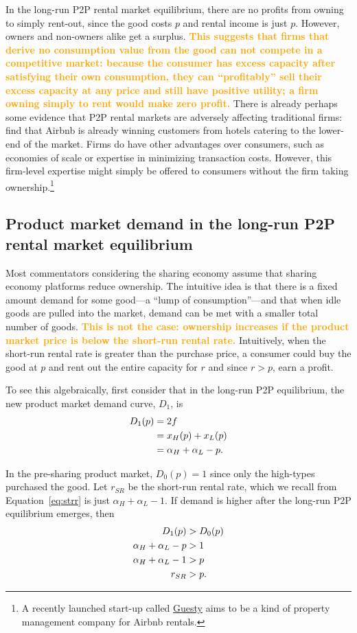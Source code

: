 \documentclass[11pt]{article}
\newcommand{\important}[1]{\textcolor{orange}{\textbf{#1}}}
\newcommand{\important}[1]{#1}
\begin{document}
In the long-run P2P rental market equilibrium, there are no profits from owning to simply rent-out, since the good costs $p$ and rental income is just $p$.  
However, owners and non-owners alike get a surplus. 
\important{This suggests that firms that derive no consumption value from the good can not compete in a competitive market: 
because the consumer has excess capacity after satisfying their own consumption, they can ``profitably'' sell their excess capacity at any price and still have positive utility; a firm owning simply to rent would make zero profit.} 
There is already perhaps some evidence that P2P rental markets are adversely affecting traditional firms: 
\cite{byers2013rise} find that Airbnb is already winning customers from hotels catering to the lower-end of the market. 
Firms do have other advantages over consumers, such as economies of scale or expertise in minimizing transaction costs. 
However, this firm-level expertise might simply be offered to consumers without the firm taking ownership.\footnote{A recently launched start-up called \href{https://www.guesty.com/}{Guesty} aims to be a kind of property management company for Airbnb rentals.} 

\subsection{Product market demand in the long-run P2P rental market equilibrium} 
Most commentators considering the sharing economy assume that sharing economy platforms reduce ownership. 
The intuitive idea is that there is a fixed amount demand for some good---a ``lump of consumption''---and that when idle goods are pulled into the market, demand can be met with a smaller total number of goods.
\important{This is not the case:  
ownership increases if the product market price is below the short-run rental rate.} 
Intuitively, when the short-run rental rate is greater than the purchase price, a consumer could buy the good at $p$ and rent out the entire capacity for $r$ and since $r > p$, earn a profit. 

To see this algebraically, first consider that in the long-run P2P equilibrium, the new product market demand curve, $D_1$, is
\begin{align}
D_1(p) &= 2f \notag \\  
     &= x_H(p) + x_L(p) \notag \\ 
     &= \alpha_H + \alpha_L - p.  
\end{align} 

In the pre-sharing product market, $D_0(p) = 1$ since only the high-types purchased the good. 
Let $r_{SR}$ be the short-run rental rate, which we recall from Equation~\ref{eq:strr} is just $\alpha_H + \alpha_L - 1$. 
If demand is higher after the long-run P2P equilibrium emerges, then  
\begin{align} 
D_{1}(p) & > D_{0}(p) \notag \\
\alpha_H + \alpha_L - p &> 1 \notag \\ 
\alpha_H + \alpha_L - 1 &> p \notag \\ 
r_{SR} &>  p. 
\end{align} 
\end{document}
